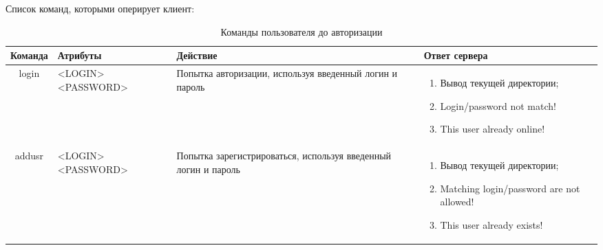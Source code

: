 Список команд, которыми оперирует клиент:

\begin{table}[H]
	\centering
	\begin{tabular}{|c|M{3cm}|M{5cm}|M{7cm}|}
		\hline Команда               & Атрибуты   & Действие  & Ответ сервера	\\
		\hline login               & <LOGIN> <PASSWORD> & Попытка авторизации, используя введенный логин и пароль  & \begin{enumerate}
	\item Вывод текущей директории;
	\item Login/password not match!
	\item This user already online!
\end{enumerate}			\\
		\hline addusr              & <LOGIN> <PASSWORD> & Попытка зарегистрироваться, используя введенный логин и пароль & \begin{enumerate}
	\item Вывод текущей директории;
	\item Matching login/password are not allowed!
	\item This user already exists!
\end{enumerate}			\\ \hline
	\end{tabular}
	\caption{Команды пользователя до авторизации}
	\label{tab:tcp_before}
\end{table}


